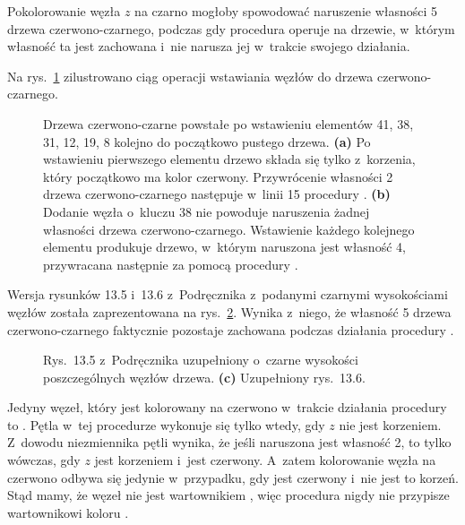 \bignegskip

\exercise %
Pokolorowanie węzła $z$ na czarno mogłoby spowodować naruszenie własności 5 drzewa czerwono-czarnego, podczas gdy procedura  operuje na drzewie, w~którym własność ta jest zachowana i~nie narusza jej w~trakcie swojego działania.

\exercise %
Na rys.\ \ref{fig:13.3-2} zilustrowano ciąg operacji wstawiania węzłów do drzewa czerwono-czarnego.
\begin{figure}[!ht]
	\centering 
	\caption{Drzewa czerwono-czarne powstałe po wstawieniu elementów 41, 38, 31, 12, 19, 8 kolejno do początkowo pustego drzewa.
	{\sffamily\bfseries(a)} Po wstawieniu pierwszego elementu drzewo składa się tylko z~korzenia, który początkowo ma kolor czerwony.
	Przywrócenie własności 2 drzewa czerwono-czarnego następuje w~linii 15 procedury .
	{\sffamily\bfseries(b)} Dodanie węzła o~kluczu 38 nie powoduje naruszenia żadnej własności drzewa czerwono-czarnego.
	{\sffamily\bfseries{}} Wstawienie każdego kolejnego elementu produkuje drzewo, w~którym naruszona jest własność 4, przywracana następnie za pomocą procedury .} \label{fig:13.3-2}
\end{figure}

\exercise %
Wersja rysunków 13.5 i~13.6 z~Podręcznika z~podanymi czarnymi wysokościami węzłów została zaprezentowana na rys.\ \ref{fig:13.3-3}.
Wynika z~niego, że własność 5 drzewa czerwono-czarnego faktycznie pozostaje zachowana podczas działania procedury .
\begin{figure}[!ht]
	\centering 
	\caption{{\sffamily\bfseries{}} Rys.\ 13.5 z~Podręcznika uzupełniony o~czarne wysokości poszczególnych węzłów drzewa.
	{\sffamily\bfseries(c)} Uzupełniony rys.\ 13.6.} \label{fig:13.3-3}
\end{figure}

\exercise %
Jedyny węzeł, który jest kolorowany na czerwono w~trakcie działania procedury  to .
Pętla  w~tej procedurze wykonuje się tylko wtedy, gdy $z$ nie jest korzeniem.
Z~dowodu niezmiennika pętli  wynika, że jeśli naruszona jest własność 2, to tylko wówczas, gdy $z$ jest korzeniem i~jest czerwony.
A~zatem kolorowanie węzła  na czerwono odbywa się jedynie w~przypadku, gdy  jest czerwony i~nie jest to korzeń.
Stąd mamy, że węzeł  nie jest wartownikiem , więc procedura  nigdy nie przypisze wartownikowi koloru .

